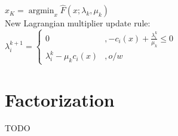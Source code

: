 \documentclass[8pt,letter]{article}
\DeclareMathOperator*{\argmin}{argmin}
\begin{document}
\begin{multicols*}{2}
  $x_K = \argmin_x \hat{F}(x; \lambda_k, \mu_k)$\\

  New Lagrangian multiplier update rule:\\
  
  $\lambda_i^{k+1} = \begin{cases}
    0 &, -c_i(x) + \frac{\lambda_i^k}{\mu_k} \leq 0\\
    \lambda_i^k - \mu_k c_i(x) &, o/w
    \end{cases}$
    
  \vfill\null
  \pagebreak

  \section{Factorization}
  TODO
  
  \end{multicols*}
\end{document}
